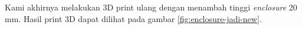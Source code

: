 \indent
Kami akhirnya melakukan 3D print ulang dengan menambah tinggi \textit{enclosure} 20 mm. Hasil print 3D dapat dilihat pada gambar \ref{fig:enclosure-jadi-new}.


